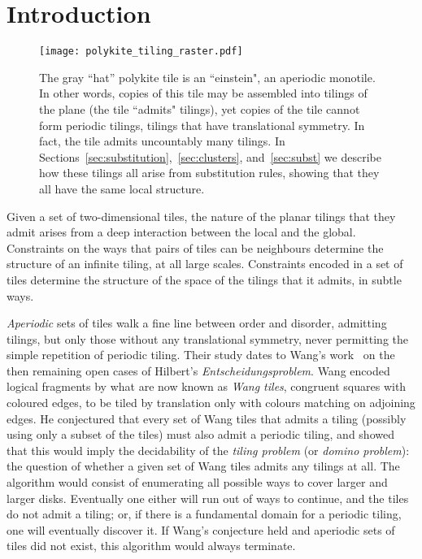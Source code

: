 \section{Introduction}
\label{sec:intro}



\begin{figure}[ht]
\begin{center}
	\texttt{[image: polykite\_tiling\_raster.pdf]}
\end{center}
\caption{\label{fig:polykite} The gray ``hat'' polykite tile
is an ``einstein", an aperiodic monotile. In other words, copies of this tile may be assembled into tilings of the plane (the tile ``admits" tilings), yet copies of the tile cannot form periodic tilings, tilings that have translational symmetry.  In fact, the tile admits uncountably many tilings. In Sections~\ref{sec:substitution},~\ref{sec:clusters}, and~\ref{sec:subst} we describe how these tilings all arise from substitution rules, showing that they all have the same local structure.}
\end{figure}

Given a set of two-dimensional tiles,  the nature of the planar tilings that they admit arises from a deep interaction between the local and the 
global.  Constraints on the ways that pairs of tiles can 
be neighbours determine the structure of an infinite tiling, at all large scales. Constraints encoded in a set of tiles determine the structure of the space of the tilings that it admits, in subtle ways.

{\em Aperiodic} sets of tiles walk a fine line between order and disorder, admitting tilings, but only  those without any translational symmetry, 
never permitting the simple repetition of  periodic tiling.  Their study dates to Wang's work~\cite{Wang} on the then remaining open cases of Hilbert's {\it Entscheidungsproblem}. Wang encoded logical fragments by what are now known as \emph{Wang tiles}, congruent squares with coloured edges, to be
tiled by translation only with colours matching on adjoining edges.
He conjectured that every set of Wang tiles that admits a tiling (possibly
using only a subset of the tiles) must also
admit a periodic tiling, and showed that this would imply the decidability
of the \textit{tiling problem} (or \textit{domino problem}): the question
of whether a given set of Wang tiles admits any tilings at all.
The algorithm would consist of enumerating all possible ways to cover
larger and larger disks.  Eventually one either will run out of ways to
continue, and the tiles do not admit a tiling; or, if there is a fundamental
domain for a periodic tiling, one will eventually discover it. 
If Wang's conjecture held and aperiodic sets of tiles did not exist, this
algorithm would always terminate.

